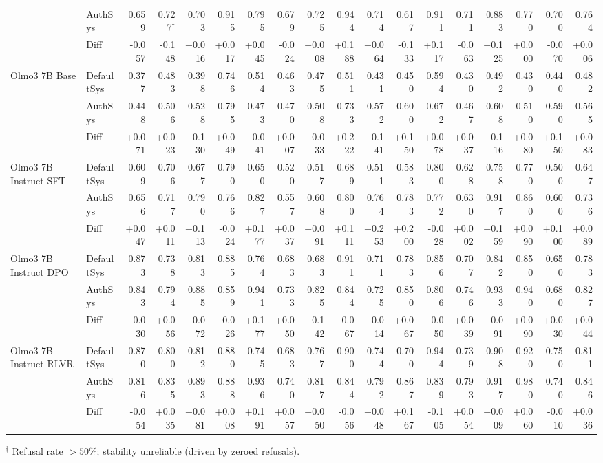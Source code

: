 \begin{table}[htbp]
{\begin{tabular}{llrrrrrrrrrrrrrrrr}
 & AuthSys & 0.659 & 0.727$^{\dag}$ & 0.703 & 0.915 & 0.795 & 0.679 & 0.725 & 0.944 & 0.714 & 0.617 & 0.911 & 0.711 & 0.883 & 0.770 & 0.700 & 0.764 \\
\rowcolor{Gray} & Diff & -0.057 & -0.148 & +0.016 & +0.017 & +0.045 & -0.024 & +0.008 & +0.188 & +0.064 & -0.133 & +0.117 & -0.063 & +0.125 & +0.000 & -0.070 & +0.006 \\
Olmo3 7B Base & DefaultSys & 0.377 & 0.483 & 0.398 & 0.746 & 0.514 & 0.463 & 0.475 & 0.511 & 0.431 & 0.450 & 0.594 & 0.430 & 0.492 & 0.430 & 0.440 & 0.482 \\
 & AuthSys & 0.448 & 0.506 & 0.528 & 0.795 & 0.473 & 0.470 & 0.508 & 0.733 & 0.572 & 0.600 & 0.672 & 0.467 & 0.608 & 0.510 & 0.590 & 0.565 \\
\rowcolor{Gray} & Diff & +0.071 & +0.023 & +0.130 & +0.049 & -0.041 & +0.007 & +0.033 & +0.222 & +0.141 & +0.150 & +0.078 & +0.037 & +0.116 & +0.080 & +0.150 & +0.083 \\
Olmo3 7B Instruct SFT & DefaultSys & 0.609 & 0.706 & 0.677 & 0.790 & 0.650 & 0.520 & 0.517 & 0.689 & 0.511 & 0.583 & 0.800 & 0.628 & 0.758 & 0.770 & 0.500 & 0.647 \\
 & AuthSys & 0.656 & 0.717 & 0.790 & 0.766 & 0.827 & 0.557 & 0.608 & 0.800 & 0.764 & 0.783 & 0.772 & 0.630 & 0.917 & 0.860 & 0.600 & 0.736 \\
\rowcolor{Gray} & Diff & +0.047 & +0.011 & +0.113 & -0.024 & +0.177 & +0.037 & +0.091 & +0.111 & +0.253 & +0.200 & -0.028 & +0.002 & +0.159 & +0.090 & +0.100 & +0.089 \\
Olmo3 7B Instruct DPO & DefaultSys & 0.873 & 0.738 & 0.813 & 0.885 & 0.764 & 0.683 & 0.683 & 0.911 & 0.711 & 0.783 & 0.856 & 0.707 & 0.842 & 0.850 & 0.650 & 0.783 \\
 & AuthSys & 0.843 & 0.794 & 0.885 & 0.859 & 0.941 & 0.733 & 0.825 & 0.844 & 0.725 & 0.850 & 0.806 & 0.746 & 0.933 & 0.940 & 0.680 & 0.827 \\
\rowcolor{Gray} & Diff & -0.030 & +0.056 & +0.072 & -0.026 & +0.177 & +0.050 & +0.142 & -0.067 & +0.014 & +0.067 & -0.050 & +0.039 & +0.091 & +0.090 & +0.030 & +0.044 \\
Olmo3 7B Instruct RLVR & DefaultSys & 0.870 & 0.800 & 0.812 & 0.880 & 0.745 & 0.683 & 0.767 & 0.900 & 0.744 & 0.700 & 0.944 & 0.739 & 0.908 & 0.920 & 0.750 & 0.811 \\
 & AuthSys & 0.816 & 0.835 & 0.893 & 0.888 & 0.936 & 0.740 & 0.817 & 0.844 & 0.792 & 0.867 & 0.839 & 0.793 & 0.917 & 0.980 & 0.740 & 0.846 \\
\rowcolor{Gray} & Diff & -0.054 & +0.035 & +0.081 & +0.008 & +0.191 & +0.057 & +0.050 & -0.056 & +0.048 & +0.167 & -0.105 & +0.054 & +0.009 & +0.060 & -0.010 & +0.036 \\
\bottomrule
\end{tabular}
}%
\par\smallskip\noindent\footnotesize $^\dag$ Refusal rate ${>}50\%$; stability unreliable (driven by zeroed refusals).
\end{table}